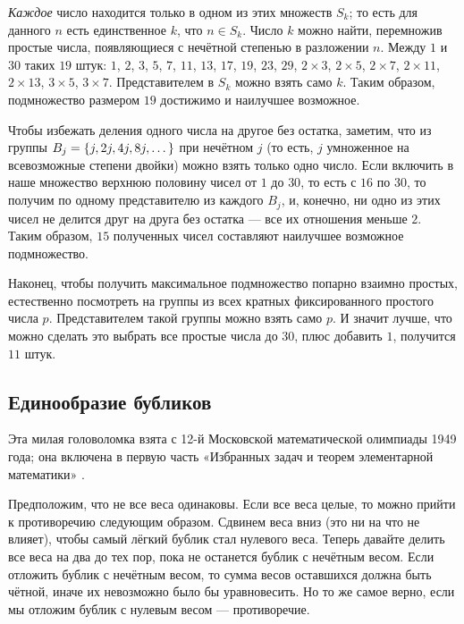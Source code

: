\emph{Каждое} число находится только в одном из этих множеств $S_k$;
то есть для данного $n$ есть единственное $k$, что $n \in S_k$.
Число $k$ можно найти, перемножив простые числа, появляющиеся с нечётной степенью в разложении $n$.
Между $1$ и $30$ таких $19$ штук: $1$, $2$, $3$, $5$, $7$, $11$, $13$, $17$, $19$,
$23$, $29$, $2 \times 3$, $2 \times 5$, $2 \times 7$, $2 \times 11$, $2 \times 13$, $3 \times 5$, $3 \times 7$.
Представителем в $S_k$ можно взять само $k$.
Таким образом, подмножество размером $19$ достижимо и наилучшее возможное.

Чтобы избежать деления одного числа на другое без остатка, заметим, что из группы $B_j \z= \{j, 2j, 4j, 8j, \dots\}$ при нечётном $j$ (то есть, $j$ умноженное на всевозможные степени двойки) можно взять только одно число.
Если включить в наше множество верхнюю половину чисел от $1$ до $30$, то есть с $16$ по $30$, то получим по одному представителю из каждого $B_j$, и, конечно, ни одно из этих чисел не делится друг на друга без остатка --- все их отношения меньше $2$.
Таким образом, $15$ полученных чисел составляют наилучшее возможное подмножество.

Наконец, чтобы получить максимальное подмножество попарно взаимно простых, естественно посмотреть на группы из всех кратных фиксированного простого числа $p$.
Представителем такой группы можно взять само $p$. 
И значит лучше, что можно сделать это выбрать все простые числа до $30$, плюс добавить $1$, получится $11$ штук.

\subsection*{Единообразие бубликов}

Эта милая головоломка взята с 12-й Московской математической олимпиады 1949 года;
она включена в первую часть «Избранных задач и теорем элементарной математики» %
\cite[задача 127, стр. 28]{51}.

Предположим, что не все веса одинаковы.
Если все веса целые, то можно прийти к противоречию следующим образом.
Сдвинем веса вниз (это ни на что не влияет), чтобы самый лёгкий бублик стал нулевого веса.
Теперь давайте делить все веса на два до тех пор, пока не останется бублик с нечётным весом.
Если отложить бублик с нечётным весом, то сумма весов оставшихся должна быть чётной, иначе их невозможно было бы уравновесить.
Но то же самое верно, если мы отложим бублик с нулевым весом --- противоречие.

